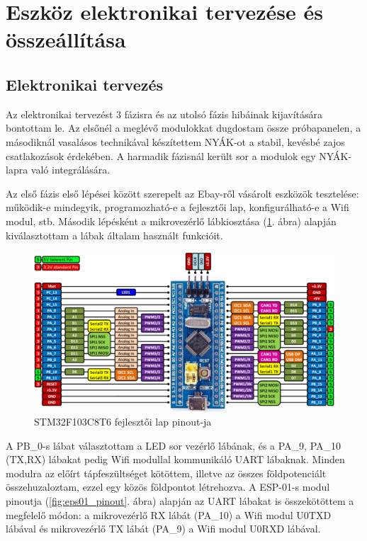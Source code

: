 \documentclass[../main.tex]{subfiles}
\begin{document}
\section{Eszköz elektronikai tervezése és összeállítása}
    \subsection{Elektronikai tervezés}
        Az elektronikai tervezést 3 fázisra és az utolsó fázis hibáinak kijavítására bontottam le. Az elsőnél a meglévő modulokkat dugdostam össze próbapanelen, a másodiknál vasalásos technikával készítettem NYÁK-ot a stabil, kevésbé zajos csatlakozások érdekében. A harmadik fázisnál került sor a modulok egy NYÁK-lapra való integrálására.
        
        Az első fázis első lépései között szerepelt az Ebay-ről vásárolt eszközök tesztelése: működik-e mindegyik, programozható-e a fejlesztői lap, konfigurálható-e a Wifi modul, stb. Második lépésként a mikrovezérlő lábkiosztása (\ref{fig:stm32f103_pinout}. ábra) alapján kiválasztottam a lábak általam használt funkcióit. 
        
        \begin{figure}[h!]
            \centering
                \includegraphics[width=14cm]{resources/pcb_res/stm32f103c8t6_pinout.png}
            \caption{STM32F103C8T6 fejlesztői lap pinout-ja \citep{armMbed}}
            \label{fig:stm32f103_pinout}
        \end{figure}
        
        A PB\_0-s lábat választottam a LED sor vezérlő lábának, és a PA\_9, PA\_10 (TX,RX) lábakat pedig Wifi modullal kommunikáló UART lábaknak. Minden modulra az előírt tápfeszültséget kötöttem, illetve az összes földpotenciált összehuzaloztam, ezzel egy közös földpontot létrehozva. A ESP-01-s modul pinoutja (\ref{fig:eps01_pinout}. ábra) alapján az UART lábakat is összekötöttem a megfelelő módon: a mikrovezérlő RX lábát (PA\_10) a Wifi modul U0TXD lábával és mikrovezérlő TX lábát (PA\_9) a Wifi modul U0RXD lábával. 
        
\end{document}
